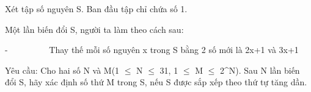 Xét tập số nguyên S. Ban đầu tập chỉ chứa số 1.  

   Một lần biến đổi S, người ta làm theo cách sau:  

   -          Thay thế mỗi số nguyên x trong S bằng 2 số mới là 2x+1 và 3x+1  

   Yêu cầu: Cho hai số N và M(1 $\le$ N $\le$ 31, 1 $\le$ M $\le$ 2^N). Sau N lần biến đổi S, hãy xác định số thứ M trong S, nếu S được sắp xếp theo thứ tự tăng dần.